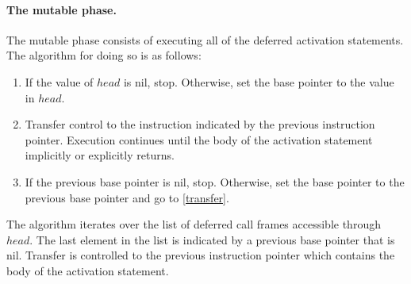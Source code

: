 \paragraph{The mutable phase.}
The mutable phase consists of executing all of the deferred activation statements.
The algorithm for doing so is as follows:
\begin{enumerate}
\item If the value of $head$ is nil, stop.  Otherwise, set the base pointer to the value in $head$.
\item Transfer control to the instruction indicated by the previous instruction pointer\label{transfer}.  Execution continues until the body of the activation statement implicitly or explicitly returns.
\item If the previous base pointer is nil, stop.  Otherwise, set the base pointer to the previous base pointer and go to \ref{transfer}.
\end{enumerate}

The algorithm iterates over the list of deferred call frames accessible through $head$.
The last element in the list is indicated by a previous base pointer that is nil.
Transfer is controlled to the previous instruction pointer which contains the body of the activation statement.

